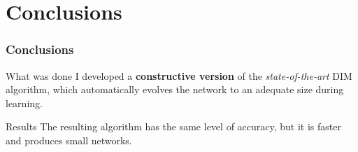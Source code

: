 \documentclass{beamer}
\begin{document}
			
	\section{Conclusions}
		\begin{frame}
			\frametitle{Conclusions}
			\begin{block}{What was done}
				I developed a \textbf{constructive version} of the \emph{state-of-the-art} DIM algorithm, which automatically evolves the network to an adequate size during learning.
			\end{block}
			\begin{block}{Results}
				The resulting algorithm has the same level of accuracy, but it is faster and produces small networks.
			\end{block}
		\end{frame}
\end{document}
